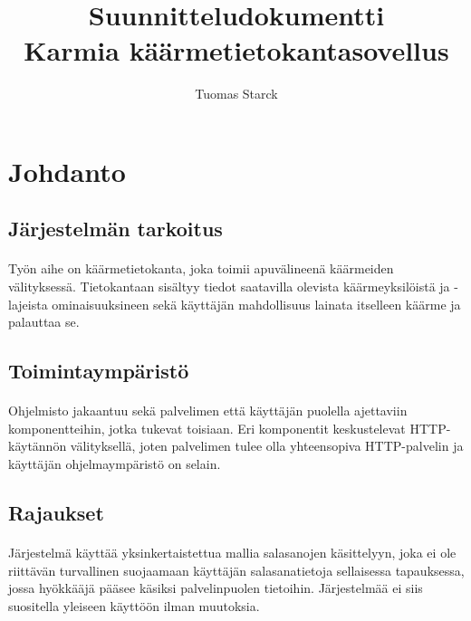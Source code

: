 \documentclass[11pt]{article}
\begin{document}
\title{\Huge{\bf Suunnitteludokumentti} \\ \Large{Karmia käärmetietokantasovellus}}
\author{Tuomas Starck}
\maketitle

\vspace{4em}

\section{Johdanto}

\subsection{Järjestelmän tarkoitus}

\paragraph{} Työn aihe on käärmetietokanta, joka toimii apuvälineenä käärmeiden vä\-li\-tyksessä. Tietokantaan sisältyy tiedot saatavilla olevista käärmeyksilöistä ja -lajeista ominaisuuksineen sekä käyttäjän mahdollisuus lainata itselleen käärme ja palauttaa se.

\subsection{Toimintaympäristö}

\paragraph{} Ohjelmisto jakaantuu sekä palvelimen että käyttäjän puolella ajettaviin komponentteihin, jotka tukevat toisiaan. Eri komponentit keskustelevat HTTP-käytännön välityksellä, joten palvelimen tulee olla yhteensopiva HTTP-palvelin ja käyttäjän ohjelmaympäristö on selain.

\subsection{Rajaukset}

\paragraph{} Järjestelmä käyttää yksinkertaistettua mallia salasanojen käsittelyyn, joka ei ole riittävän turvallinen suojaamaan käyttäjän salasanatietoja sellaisessa tapauksessa, jossa hyökkääjä pääsee käsiksi palvelinpuolen tietoihin. Järjestelmää ei siis suositella yleiseen käyttöön ilman muutoksia.
\end{document}
